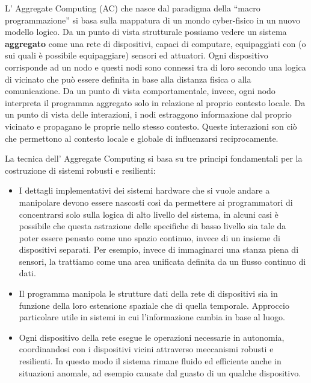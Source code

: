 \documentclass[12pt,a4paper,openright,twoside]{book}
\begin{document}
L' Aggregate Computing (AC) che nasce dal paradigma della ``macro programmazione'' si basa sulla mappatura di un mondo cyber-fisico in un nuovo modello logico. Da un punto di vista strutturale possiamo vedere un sistema \textbf{aggregato} come una rete di dispositivi, capaci di computare, equipaggiati con (o sui quali è possibile equipaggiare) sensori ed attuatori. Ogni dispositivo corrisponde ad un nodo e questi nodi sono connessi tra di loro secondo una logica di vicinato che può essere definita in base alla distanza fisica o alla comunicazione. Da un punto di vista comportamentale, invece, ogni nodo interpreta il programma aggregato solo in relazione al proprio contesto locale. Da un punto di vista delle interazioni, i nodi estraggono informazione dal proprio vicinato e propagano le proprie nello stesso contesto. Queste interazioni son ciò che permettono al contesto locale e globale di influenzarsi reciprocamente.

La tecnica dell' Aggregate Computing si basa su tre principi fondamentali per la costruzione di sistemi robusti e resilienti:

\begin{itemize}
    \item I dettagli implementativi dei sistemi hardware che si vuole andare a manipolare devono essere nascosti così da permettere ai programmatori di concentrarsi solo sulla logica di alto livello del sistema, in alcuni casi è possibile che questa astrazione delle specifiche di basso livello sia tale da poter essere pensato come uno spazio continuo, invece di un insieme di dispositivi separati. Per esempio, invece di immaginarci una stanza piena di sensori, la trattiamo come una area unificata definita da un flusso continuo di dati.
    \item Il programma manipola le strutture dati della rete di dispositivi sia in funzione della loro estensione spaziale che di quella temporale. Approccio particolare utile in sistemi in cui l'informazione cambia in base al luogo.
    \item Ogni dispositivo della rete esegue le operazioni necessarie in autonomia, coordinandosi con i dispositivi vicini attraverso meccanismi robusti e resilienti. In questo modo il sistema rimane fluido ed efficiente anche in situazioni anomale, ad esempio causate dal guasto di un qualche dispositivo.
\end{itemize}
\end{document}
